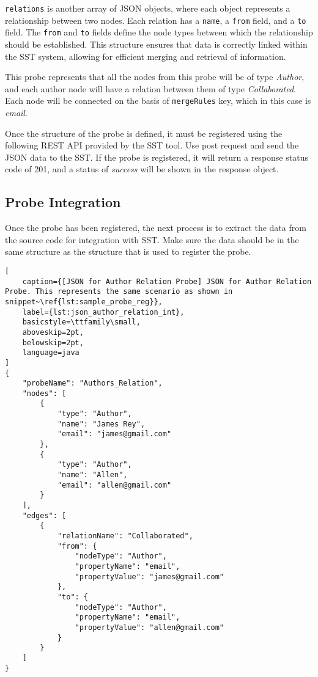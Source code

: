 \texttt{relations} is another array of JSON objects, where each object represents a relationship between two nodes. Each relation has a \texttt{name}, a \texttt{from} field, and a \texttt{to} field. The \texttt{from} and \texttt{to} fields define the node types between which the relationship should be established. This structure ensures that data is correctly linked within the SST system, allowing for efficient merging and retrieval of information.

This probe represents that all the nodes from this probe will be of type \textit{Author}, and each author node will have a relation between them of type \textit{Collaborated}. Each node will be connected on the basis of \texttt{mergeRules} key, which in this case is \textit{email}.

Once the structure of the probe is defined, it must be registered using the following REST API provided by the SST tool. Use post request and send the JSON data to the SST. If the probe is registered, it will return a response status code of 201, and a status of \textit{success} will be shown in the response object.

\subsection{Probe Integration}

Once the probe has been registered, the next process is to extract the data from the source code for integration with SST. Make sure the data should be in the same structure as the structure that is used to register the probe.

\begin{lstlisting}[
    caption={[JSON for Author Relation Probe] JSON for Author Relation Probe. This represents the same scenario as shown in snippet~\ref{lst:sample_probe_reg}}, 
    label={lst:json_author_relation_int},
    basicstyle=\ttfamily\small,
    aboveskip=2pt,
    belowskip=2pt,
    language=java
]
{
    "probeName": "Authors_Relation",
    "nodes": [
        {
            "type": "Author",
            "name": "James Rey",
            "email": "james@gmail.com"
        },
        {
            "type": "Author",
            "name": "Allen",
            "email": "allen@gmail.com"
        }
    ],
    "edges": [
        {
            "relationName": "Collaborated",
            "from": {
                "nodeType": "Author",
                "propertyName": "email",
                "propertyValue": "james@gmail.com"
            },
            "to": {
                "nodeType": "Author",
                "propertyName": "email",
                "propertyValue": "allen@gmail.com"
            }
        }
    ]
}
\end{lstlisting}